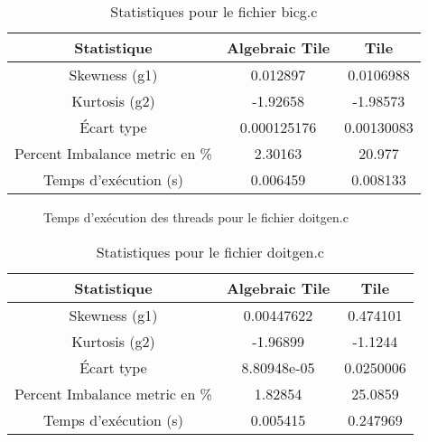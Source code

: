 \documentclass{article}
\begin{document}
\begin{table}[htbp]
  \centering
  \caption{Statistiques pour le fichier bicg.c}
  \begin{tabular}{|c|c|c|}
    \hline
    Statistique & Algebraic Tile & Tile \\ 
    \hline
    Skewness (g1) & 0.012897 & 0.0106988 \\ 
    Kurtosis (g2) & -1.92658 & -1.98573 \\ 
    Écart type & 0.000125176 & 0.00130083 \\ 
    Percent Imbalance metric en \% & 2.30163 & 20.977 \\ 
    Temps d'exécution (s) &  0.006459      &  0.008133    \\ 
    \hline
  \end{tabular}
\end{table}
\newpage

\begin{figure}
  \centering
  \caption{Temps d'exécution des threads pour le fichier doitgen.c}
  \label{fig:doitgen.c}
\end{figure}

\begin{table}[htbp]
  \centering
  \caption{Statistiques pour le fichier doitgen.c}
  \begin{tabular}{|c|c|c|}
    \hline
    Statistique & Algebraic Tile & Tile \\ 
    \hline
    Skewness (g1) & 0.00447622 & 0.474101 \\ 
    Kurtosis (g2) & -1.96899 & -1.1244 \\ 
    Écart type & 8.80948e-05 & 0.0250006 \\ 
    Percent Imbalance metric en \% & 1.82854 & 25.0859 \\ 
    Temps d'exécution (s) &  0.005415      &  0.247969    \\ 
    \hline
  \end{tabular}
\end{table}
\newpage
\end{document}
